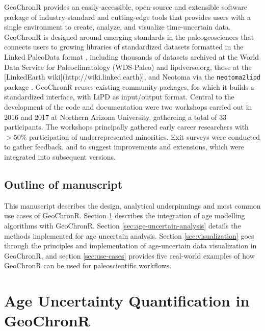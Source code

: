\documentclass[gchron, manuscript]{copernicus}
\begin{document}
GeoChronR provides an easily-accessible, open-source and extensible software package of industry-standard and cutting-edge tools that provides users with a single environment to create, analyze, and visualize time-uncertain data.
GeoChronR is designed around emerging standards in the paleogeosciences that connects users to growing libraries of standardized datasets formatted in the Linked PaleoData format \citep{lipd_cp}, including thousands of datasets archived at the World Data Service for Paleoclimatology (WDS-Paleo) and lipdverse.org, those at the {[}LinkedEarth wiki{[}(http://wiki.linked.earth){]}, and Neotoma \citep{williams2018neotoma} via the \texttt{neotoma2lipd} package \citep{neotoma2lipd}.
GeoChronR reuses existing community packages, for which it builds a standardized interface, with LiPD as input/output format.
Central to the development of the code and documentation were two workshops carried out in 2016 and 2017 at Northern Arizona University, gathereing a total of 33 participants. The workshops principally gathered early career researchers with \(>50\%\) participation of underrepresented minorities. Exit surveys were conducted to gather feedback, and to suggest improvements and extensions, which were integrated into subsequent versions.

\subsection{Outline of manuscript}

This manuscript describes the design, analytical underpinnings and most common use cases of GeoChronR.
Section \ref{sec:age-modeling} describes the integration of age modelling algorithms with GeoChronR.
Section \ref{sec:age-uncertain-analysis} details the methods implemented for age uncertain analysis.
Section \ref{sec:visualization} goes through the principles and implementation of age-uncertain data visualization in GeoChronR, and section \ref{sec:use-cases} provides five real-world examples of how GeoChronR can be used for paleoscientific workflows.

\hypertarget{sec:age-modeling}{%
\section{Age Uncertainty Quantification in GeoChronR}\label{sec:age-modeling}}
\end{document}
